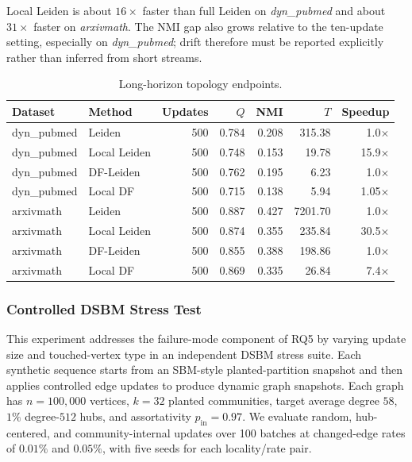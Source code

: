 \documentclass[conference]{IEEEtran}
\theoremstyle{definition}
\begin{document}
Local Leiden is about $16\times$ faster than full Leiden on \textit{dyn\_pubmed}
and about $31\times$ faster on \textit{arxivmath}. The NMI gap also grows
relative to the ten-update setting, especially on \textit{dyn\_pubmed}; drift
therefore must be reported explicitly rather than inferred from short streams.

\begin{table}[H]
\centering
\caption{Long-horizon topology endpoints.}
\label{tab:long-horizon}
\setlength{\tabcolsep}{2pt}
\scriptsize
\begin{tabular}{@{}llrrrrr@{}}
\toprule
\textbf{Dataset} & \textbf{Method} & \textbf{Updates} &
\textbf{$Q$} & \textbf{NMI} & \textbf{$T$} & \textbf{Speedup} \\
\midrule
dyn\_pubmed & Leiden & 500 & 0.784 & 0.208 & 315.38 & 1.0$\times$ \\
dyn\_pubmed & Local Leiden & 500 & 0.748 & 0.153 & 19.78 & 15.9$\times$ \\
dyn\_pubmed & DF-Leiden & 500 & 0.762 & 0.195 & 6.23 & 1.0$\times$ \\
dyn\_pubmed & Local DF & 500 & 0.715 & 0.138 & 5.94 & 1.05$\times$ \\
\midrule
arxivmath & Leiden & 500 & 0.887 & 0.427 & 7201.70 & 1.0$\times$ \\
arxivmath & Local Leiden & 500 & 0.874 & 0.355 & 235.84 & 30.5$\times$ \\
arxivmath & DF-Leiden & 500 & 0.855 & 0.388 & 198.86 & 1.0$\times$ \\
arxivmath & Local DF & 500 & 0.869 & 0.335 & 26.84 & 7.4$\times$ \\
\bottomrule
\end{tabular}
\end{table}

\subsubsection{Controlled DSBM Stress Test}

This experiment addresses the failure-mode component of RQ5 by varying update
size and touched-vertex type in an independent DSBM stress suite. Each
synthetic sequence starts from an SBM-style planted-partition snapshot and then
applies controlled edge updates to produce dynamic graph snapshots. Each graph
has $n=100{,}000$ vertices, $k=32$ planted communities, target average degree
$58$, $1\%$ degree-$512$ hubs, and assortativity
$p_{\mathrm{in}}=0.97$. We evaluate random, hub-centered, and
community-internal updates over 100 batches at changed-edge rates of
$0.01\%$ and $0.05\%$, with five seeds for each locality/rate pair.
\end{document}
